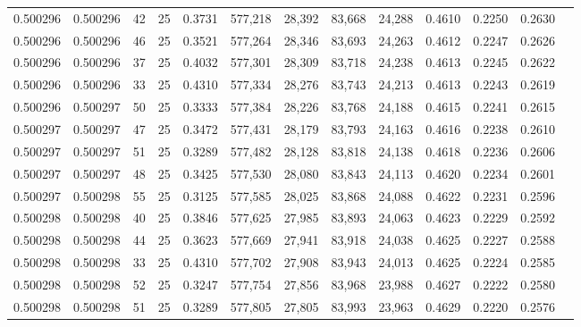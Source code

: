\begin{tabular}{rrrrrrrrrrrrr}
0.500296 & 0.500296 &    42 &  25 &                                     0.3731 & 577,218 &  28,392 &  83,668 &  24,288 & 0.4610 & 0.2250 & 0.2630 \\
0.500296 & 0.500296 &    46 &  25 &                                     0.3521 & 577,264 &  28,346 &  83,693 &  24,263 & 0.4612 & 0.2247 & 0.2626 \\
0.500296 & 0.500296 &    37 &  25 &                                     0.4032 & 577,301 &  28,309 &  83,718 &  24,238 & 0.4613 & 0.2245 & 0.2622 \\
0.500296 & 0.500296 &    33 &  25 &                                     0.4310 & 577,334 &  28,276 &  83,743 &  24,213 & 0.4613 & 0.2243 & 0.2619 \\
0.500296 & 0.500297 &    50 &  25 &                                     0.3333 & 577,384 &  28,226 &  83,768 &  24,188 & 0.4615 & 0.2241 & 0.2615 \\
0.500297 & 0.500297 &    47 &  25 &                                     0.3472 & 577,431 &  28,179 &  83,793 &  24,163 & 0.4616 & 0.2238 & 0.2610 \\
0.500297 & 0.500297 &    51 &  25 &                                     0.3289 & 577,482 &  28,128 &  83,818 &  24,138 & 0.4618 & 0.2236 & 0.2606 \\
0.500297 & 0.500297 &    48 &  25 &                                     0.3425 & 577,530 &  28,080 &  83,843 &  24,113 & 0.4620 & 0.2234 & 0.2601 \\
0.500297 & 0.500298 &    55 &  25 &                                     0.3125 & 577,585 &  28,025 &  83,868 &  24,088 & 0.4622 & 0.2231 & 0.2596 \\
0.500298 & 0.500298 &    40 &  25 &                                     0.3846 & 577,625 &  27,985 &  83,893 &  24,063 & 0.4623 & 0.2229 & 0.2592 \\
0.500298 & 0.500298 &    44 &  25 &                                     0.3623 & 577,669 &  27,941 &  83,918 &  24,038 & 0.4625 & 0.2227 & 0.2588 \\
0.500298 & 0.500298 &    33 &  25 &                                     0.4310 & 577,702 &  27,908 &  83,943 &  24,013 & 0.4625 & 0.2224 & 0.2585 \\
0.500298 & 0.500298 &    52 &  25 &                                     0.3247 & 577,754 &  27,856 &  83,968 &  23,988 & 0.4627 & 0.2222 & 0.2580 \\
0.500298 & 0.500298 &    51 &  25 &                                     0.3289 & 577,805 &  27,805 &  83,993 &  23,963 & 0.4629 & 0.2220 & 0.2576 \\

\end{tabular}
